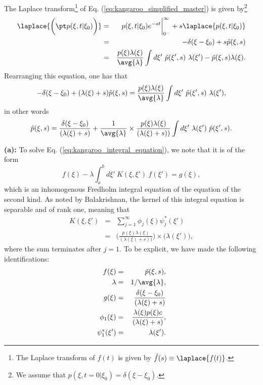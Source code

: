 The Laplace transform\footnote{The Laplace transform of $f(t)$ is given by $\tilde{f}(s) \equiv \laplace{f(t)}$.} of Eq. (\ref{eq:kangaroo_simplified_master}) is given by\footnote{We assume that $p(\xi,t=0|\xi_0) = \delta(\xi-\xi_0)$.}
\begin{eqnarray}
\laplace{\bigg(\pt p(\xi, t|\xi_0) \bigg)} &=& p(\xi, t | \xi_0) e^{-s t} \bigg|^{\infty}_{0^-} + s\laplace{p(\xi, t|\xi_0)} \nonumber \\
&=& - \delta(\xi-\xi_0) + s \tilde{p}(\xi, s) \nonumber \\
&=&  \frac{p(\xi)\lambda(\xi)}{\avg{\lambda}} \int d \xi'~\tilde{p}(\xi', s)~\lambda(\xi') - \tilde{p}(\xi, s) \lambda(\xi)  \nonumber.
\end{eqnarray}
Rearranging this equation, one has that
\begin{equation}
- \delta(\xi-\xi_0) + (\lambda(\xi)+s) \tilde{p}(\xi, s) =  \frac{p(\xi)\lambda(\xi)}{\avg{\lambda}}  \int d \xi'~\tilde{p}(\xi', s)~\lambda(\xi'), \nonumber
\end{equation}
in other words
\begin{equation}
\tilde{p}(\xi, s) = \frac{\delta(\xi-\xi_0)}{(\lambda(\xi)+s)} + \frac{1}{\avg{\lambda}} \times \frac{p(\xi)\lambda(\xi)}{(\lambda(\xi)+s))}  \int d \xi'~\lambda(\xi')~\tilde{p}(\xi', s). \label{eq:kangaroo_integral_equation}
\end{equation}

\textbf{(a):} To solve Eq. (\ref{eq:kangaroo_integral_equation}), we note that it is of the form
\begin{equation}
f(\xi) - \lambda \int_{a}^{b} d \xi'~K(\xi, \xi')~f(\xi') = g(\xi), \label{eq:fredholm}
\end{equation}
which is an inhomogenous Fredholm integral equation of the equation of the second kind.
As noted by Balakrishnan, the kernel of this integral equation is separable and of rank one, meaning that
\begin{eqnarray}
K(\xi, \xi') &=& \sum_{j=1}^{\infty} \phi_j(\xi) \psi_j^*(\xi') \nonumber \\
&=& \bigg(\frac{p(\xi)\lambda(\xi)}{(\lambda(\xi)+s))} \bigg) \times \bigg(  \lambda(\xi') \bigg), \nonumber
\end{eqnarray}
where the sum terminates after $j=1$. To be explicit, we have made the following identifications:
\begin{eqnarray}
f(\xi) &=& \tilde{p}(\xi, s), \\
\lambda &=& 1/\avg{\lambda}, \\
g(\xi) &=& \frac{\delta(\xi-\xi_0)}{(\lambda(\xi)+s)} \\
\phi_1(\xi) &=& \frac{\lambda(\xi) p(\xi)c}{(\lambda(\xi)+s)} , \\
\psi_1^*(\xi') &=& \lambda(\xi').
\end{eqnarray}

